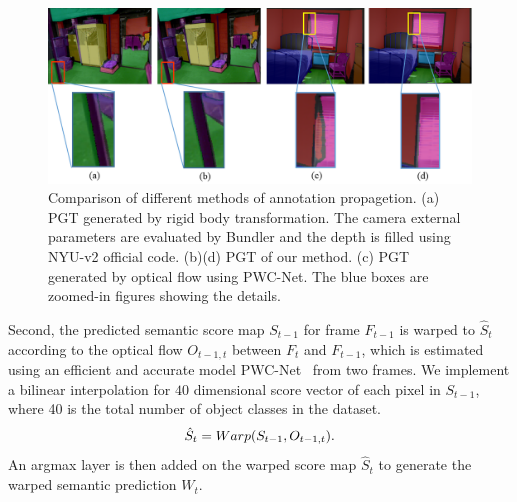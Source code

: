 \begin{figure}[t]
	\centering
	\includegraphics[width=\columnwidth]{figure/PGT_compared.png}
	\caption{Comparison of different methods of annotation propagetion. (a) PGT generated by rigid body transformation. The camera external parameters are evaluated by Bundler and the depth is filled using NYU-v2 official code. (b)(d) PGT of our method. (c) PGT generated by optical flow using PWC-Net\cite{Sun2018}. The blue boxes are zoomed-in figures showing the details.}
	\label{fig:PGT_Com}
	
\end{figure}
Second, the predicted semantic score map $S_{t-1}$ for frame $F_{t-1}$ is warped to $\hat{S}_{t}$ according to the optical flow $O_{t-1,t}$ between $F_t$ and $F_{t-1}$, which is estimated using an efficient and accurate model PWC-Net~\cite{Sun2018} from two frames. 
We implement a bilinear interpolation for $40$ dimensional score vector of each pixel in $S_{t-1}$, where 40 is the total number of object classes in the dataset. 
\begin{equation}
\centering
\hat{S}_{t}=Warp(S_{t-1},O_{t-1,t}).
\end{equation}
%
An argmax layer is then added on the warped score map ${\hat{S}_{t}}$ to generate the warped semantic prediction $W_{t}$.

